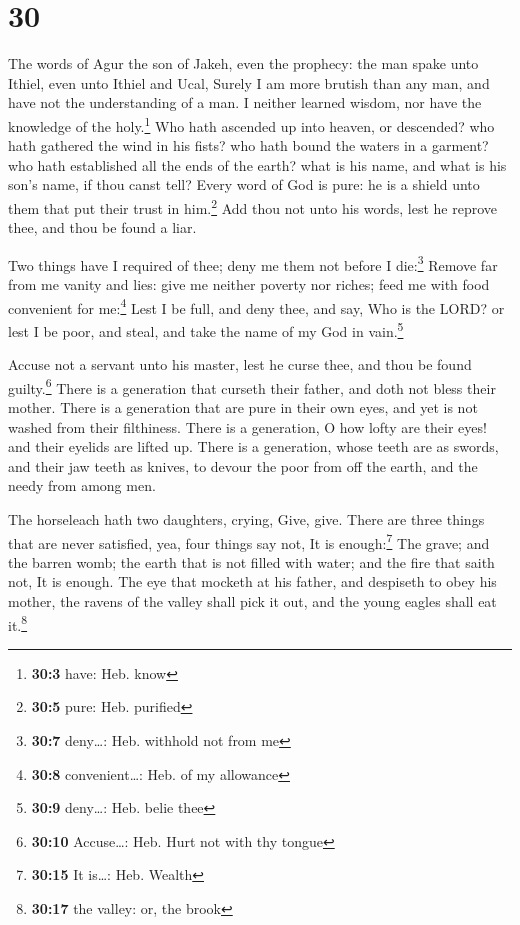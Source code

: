 \hypertarget{section-29}{%
\section{30}\label{section-29}}

 The words of Agur the son of Jakeh, even the prophecy:
the man spake unto Ithiel, even unto Ithiel and Ucal, 
Surely I am more brutish than any man, and have not the understanding of
a man.  I neither learned wisdom, nor have the knowledge
of the holy.\footnote{\textbf{30:3} have: Heb. know}  Who
hath ascended up into heaven, or descended? who hath gathered the wind
in his fists? who hath bound the waters in a garment? who hath
established all the ends of the earth? what is his name, and what is his
son's name, if thou canst tell?  Every word of God is
pure: he is a shield unto them that put their trust in him.\footnote{\textbf{30:5}
  pure: Heb. purified}  Add thou not unto his words, lest
he reprove thee, and thou be found a liar.

 Two things have I required of thee; deny me them not
before I die:\footnote{\textbf{30:7} deny\ldots: Heb. withhold not from
  me}  Remove far from me vanity and lies: give me neither
poverty nor riches; feed me with food convenient for me:\footnote{\textbf{30:8}
  convenient\ldots: Heb. of my allowance}  Lest I be full,
and deny thee, and say, Who is the LORD? or lest I be poor, and steal,
and take the name of my God in vain.\footnote{\textbf{30:9} deny\ldots:
  Heb. belie thee}

 Accuse not a servant unto his master, lest he curse
thee, and thou be found guilty.\footnote{\textbf{30:10} Accuse\ldots:
  Heb. Hurt not with thy tongue}  There is a generation
that curseth their father, and doth not bless their mother.
 There is a generation that are pure in their own eyes,
and yet is not washed from their filthiness.  There is a
generation, O how lofty are their eyes! and their eyelids are lifted up.
 There is a generation, whose teeth are as swords, and
their jaw teeth as knives, to devour the poor from off the earth, and
the needy from among men.

 The horseleach hath two daughters, crying, Give, give.
There are three things that are never satisfied, yea, four things say
not, It is enough:\footnote{\textbf{30:15} It is\ldots: Heb. Wealth}
 The grave; and the barren womb; the earth that is not
filled with water; and the fire that saith not, It is enough.
 The eye that mocketh at his father, and despiseth to
obey his mother, the ravens of the valley shall pick it out, and the
young eagles shall eat it.\footnote{\textbf{30:17} the valley: or, the
  brook}

